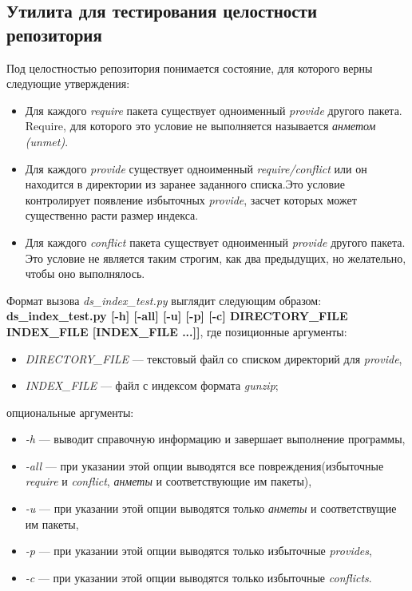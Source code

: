 \subsection{Утилита для тестирования целостности репозитория}
Под целостностью репозитория понимается состояние, для которого
верны следующие утверждения:
\begin{itemize}
\item{Для каждого \textit{require} пакета существует одноименный \textit{provide} 
другого пакета. Require, для которого это условие не выполняется
называется \textit{анметом (unmet)}. }
\item{Для каждого \textit{provide} существует одноименный \textit{require/conflict} или
он находится в директории из заранее заданного списка.Это условие 
контролирует появление избыточных \textit{provide}, засчет которых %
может существенно расти размер индекса.}
\item{Для каждого \textit{conflict} пакета существует одноименный \textit{provide} 
другого пакета. Это условие не является таким строгим, как два предыдущих,
но желательно, чтобы оно выполнялось. }
\end{itemize}

Формат вызова \textit{ds\_index\_test.py} выглядит следующим образом:\\
\textbf{ds\_index\_test.py [-h] [-all] [-u] [-p] [-c] DIRECTORY\_FILE INDEX\_FILE [INDEX\_FILE ...]]},
 где
позиционные аргументы:\\
\begin{itemize}


\item{\emph{DIRECTORY\_FILE} --- текстовый файл со списком директорий для \textit{provide},}
\item{\emph{INDEX\_FILE} --- файл с индексом формата \textit{gunzip};}
\end{itemize}

опциональные аргументы:\\
\begin{itemize}
\item{\emph{-h} --- выводит справочную информацию и завершает выполнение программы,}
\item{\emph{-all} --- при указании этой опции выводятся все повреждения(избыточные \textit{require} и \textit{conflict}, \textit{анметы} и
соответствующие им пакеты),}
\item{\emph{-u} --- при указании этой опции выводятся только \textit{анметы} и соответствущие им пакеты,}
\item{\emph{-p} --- при указании этой опции выводятся только  избыточные \textit{provides},}
\item{\emph{-c} --- при указании этой опции выводятся только избыточные \textit{conflicts}.}

\end{itemize}


